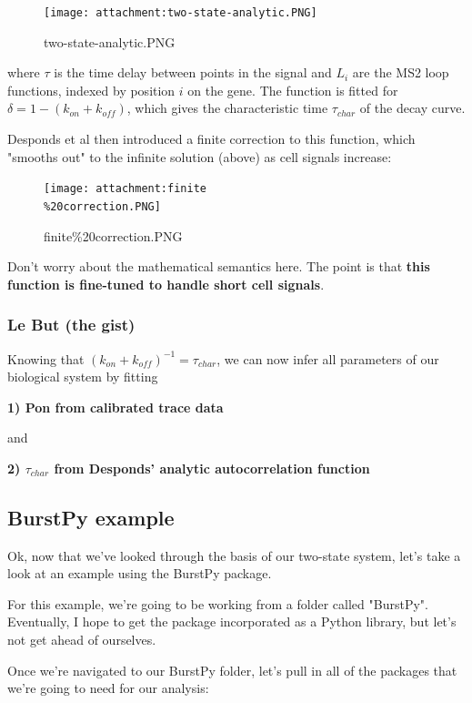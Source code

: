 \documentclass[11pt]{article}
\begin{document}
\begin{figure}
\centering
\texttt{[image: attachment:two-state-analytic.PNG]}
\caption{two-state-analytic.PNG}
\end{figure}

where \(\tau\) is the time delay between points in the signal and
\(L_i\) are the MS2 loop functions, indexed by position \(i\) on the
gene. The function is fitted for \(\delta = 1 - (k_{on} + k_{off})\),
which gives the characteristic time \(\tau_{char}\) of the decay curve.

Desponds et al then introduced a finite correction to this function,
which "smooths out" to the infinite solution (above) as cell signals
increase:

\begin{figure}
\centering
\texttt{[image: attachment:finite\\\%20correction.PNG]}
\caption{finite\%20correction.PNG}
\end{figure}

Don't worry about the mathematical semantics here. The point is that
\textbf{this function is fine-tuned to handle short cell signals}.

    \subsubsection{Le But (the gist)}\label{le-but-the-gist}

Knowing that \((k_{on} + k_{off})^{-1} = \tau_{char}\), we can now infer
all parameters of our biological system by fitting

\textbf{1) Pon from calibrated trace data}

and

\textbf{2) \(\tau_{char}\) from Desponds' analytic autocorrelation
function}

    \subsection{BurstPy example}\label{burstpy-example}

Ok, now that we've looked through the basis of our two-state system,
let's take a look at an example using the BurstPy package.

    For this example, we're going to be working from a folder called
"BurstPy". Eventually, I hope to get the package incorporated as a
Python library, but let's not get ahead of ourselves.

    Once we're navigated to our BurstPy folder, let's pull in all of the
packages that we're going to need for our analysis:
\end{document}
